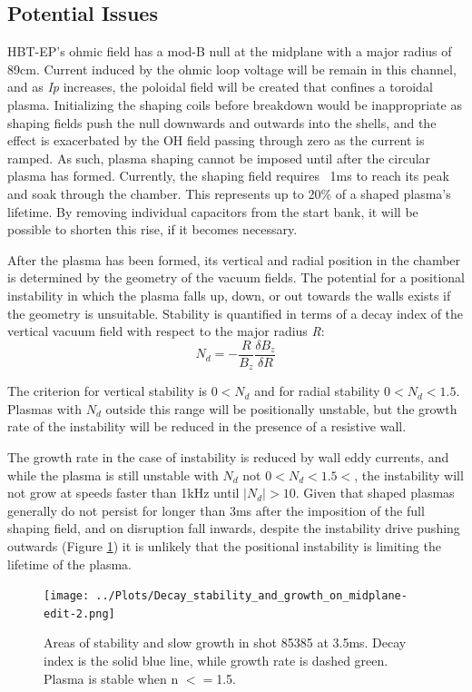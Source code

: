 \documentclass[aps,prl,twocolumn,superscriptaddress,groupedaddress]{revtex4}  %
\begin{document}
\subsection{Potential Issues}
	HBT-EP's ohmic field has a mod-B null at the midplane with a major radius of 89cm.  Current induced by the ohmic loop voltage will be remain in this channel, and as \textit{Ip} increases, the poloidal field will be created that confines a toroidal plasma.  Initializing the shaping coils before breakdown would be inappropriate as shaping fields push the null downwards and outwards into the shells, and the effect is exacerbated by the OH field passing through zero as the current is ramped.  As such, plasma shaping cannot be imposed until after the circular plasma has formed.  Currently, the shaping field requires ~1ms to reach its peak and soak through the chamber.  This represents up to 20\% of a shaped plasma's lifetime.  By removing individual capacitors from the start bank, it will be possible to shorten this rise, if it becomes necessary.\par
	After the plasma has been formed, its vertical and radial position in the chamber is determined by the geometry of the vacuum fields.  The potential for a positional instability in which the plasma falls up, down, or out towards the walls exists if the geometry is unsuitable.  Stability is quantified in terms of a decay index of the vertical vacuum field with respect to the major radius \textit{R}:$$N_d = -\frac{R}{B_z}\frac{\delta B_z}{\delta R}$$\par
	The criterion for vertical stability is $0 < N_d$ and for radial stability $0 < N_d < 1.5$.  Plasmas with $N_d$ outside this range will be positionally unstable, but the growth rate of the instability will be reduced in the presence of a resistive wall\cite{Fukuyama}.
	\par The growth rate in the case of instability is reduced by wall eddy currents, and while the plasma is still unstable with $N_d$ not $0<N_d<1.5<$, the instability will not grow at speeds faster than 1kHz until $|N_d| > 10$.  %
	Given that shaped plasmas generally do not persist for longer than 3ms after the imposition of the full shaping field, and on disruption fall inwards, despite the instability drive pushing outwards (Figure \ref{decay_index_and growth}) it is unlikely that the positional instability is limiting the lifetime of the plasma.

\begin{figure}[htb]
\centering
\texttt{[image: ../Plots/Decay\_stability\_and\_growth\_on\_midplane-edit-2.png]}
\caption{Areas of stability and slow growth in shot 85385 at 3.5ms. Decay index is the solid blue line, while growth rate is dashed green. Plasma is stable when n $<=$1.5.}
\label{decay_index_and growth}
\end{figure}
\end{document}
